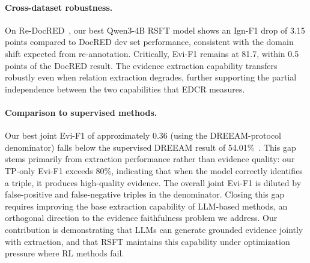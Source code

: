 \paragraph{Cross-dataset robustness.}
On Re-DocRED~\citep{tan2022redocred}, our best Qwen3-4B RSFT model shows an Ign-F1 drop of 3.15 points compared to DocRED dev set performance, consistent with the domain shift expected from re-annotation. Critically, Evi-F1 remains at 81.7, within 0.5 points of the DocRED result. The evidence extraction capability transfers robustly even when relation extraction degrades, further supporting the partial independence between the two capabilities that EDCR measures.

\paragraph{Comparison to supervised methods.}
Our best joint Evi-F1 of approximately 0.36 (using the DREEAM-protocol denominator) falls below the supervised DREEAM result of 54.01\%~\citep{ma2023dreeam}. This gap stems primarily from extraction performance rather than evidence quality: our TP-only Evi-F1 exceeds 80\%, indicating that when the model correctly identifies a triple, it produces high-quality evidence. The overall joint Evi-F1 is diluted by false-positive and false-negative triples in the denominator. Closing this gap requires improving the base extraction capability of LLM-based methods, an orthogonal direction to the evidence faithfulness problem we address. Our contribution is demonstrating that LLMs can generate grounded evidence jointly with extraction, and that RSFT maintains this capability under optimization pressure where RL methods fail.
